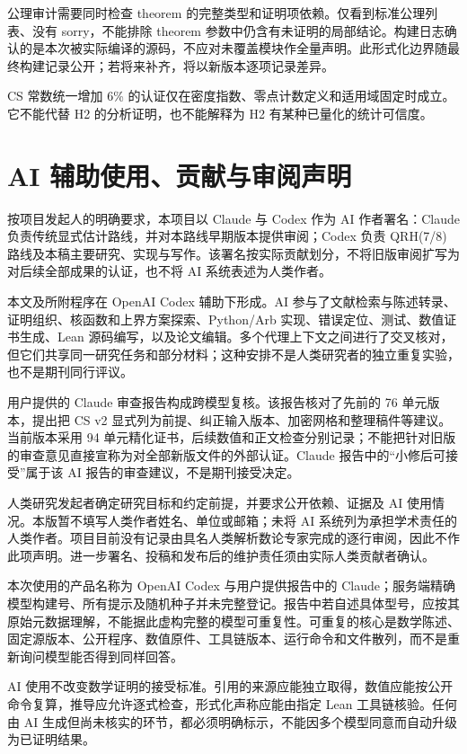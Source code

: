 \documentclass[UTF8,zihao=-4,fontset=fandol]{ctexart}
\begin{document}
公理审计需要同时检查 theorem 的完整类型和证明项依赖。仅看到标准公理列表、没有 sorry，不能排除 theorem 参数中仍含有未证明的局部结论。构建日志确认的是本次被实际编译的源码，不应对未覆盖模块作全量声明。此形式化边界随最终构建记录公开；若将来补齐，将以新版本逐项记录差异。

CS 常数统一增加 6\% 的认证仅在密度指数、零点计数定义和适用域固定时成立。它不能代替 H2 的分析证明，也不能解释为 H2 有某种已量化的统计可信度。

\section{AI 辅助使用、贡献与审阅声明}

按项目发起人的明确要求，本项目以 Claude 与 Codex 作为 AI 作者署名：Claude 负责传统显式估计路线，并对本路线早期版本提供审阅；Codex 负责 QRH(7/8) 路线及本稿主要研究、实现与写作。该署名按实际贡献划分，不将旧版审阅扩写为对后续全部成果的认证，也不将 AI 系统表述为人类作者。

本文及所附程序在 OpenAI Codex 辅助下形成。AI 参与了文献检索与陈述转录、证明组织、核函数和上界方案探索、Python/Arb 实现、错误定位、测试、数值证书生成、Lean 源码编写，以及论文编辑。多个代理上下文之间进行了交叉核对，但它们共享同一研究任务和部分材料；这种安排不是人类研究者的独立重复实验，也不是期刊同行评议。

用户提供的 Claude 审查报告构成跨模型复核。该报告核对了先前的 76 单元版本，提出把 CS v2 显式列为前提、纠正输入版本、加密网格和整理稿件等建议。当前版本采用 94 单元精化证书，后续数值和正文检查分别记录；不能把针对旧版的审查意见直接宣称为对全部新版文件的外部认证。Claude 报告中的“小修后可接受”属于该 AI 报告的审查建议，不是期刊接受决定。

人类研究发起者确定研究目标和约定前提，并要求公开依赖、证据及 AI 使用情况。本版暂不填写人类作者姓名、单位或邮箱；未将 AI 系统列为承担学术责任的人类作者。项目目前没有记录由具名人类解析数论专家完成的逐行审阅，因此不作此项声明。进一步署名、投稿和发布后的维护责任须由实际人类贡献者确认。

本次使用的产品名称为 OpenAI Codex 与用户提供报告中的 Claude；服务端精确模型构建号、所有提示及随机种子并未完整登记。报告中若自述具体型号，应按其原始元数据理解，不能据此虚构完整的模型可重复性。可重复的核心是数学陈述、固定源版本、公开程序、数值原件、工具链版本、运行命令和文件散列，而不是重新询问模型能否得到同样回答。

AI 使用不改变数学证明的接受标准。引用的来源应能独立取得，数值应能按公开命令复算，推导应允许逐式检查，形式化声称应能由指定 Lean 工具链核验。任何由 AI 生成但尚未核实的环节，都必须明确标示，不能因多个模型同意而自动升级为已证明结果。
\end{document}
